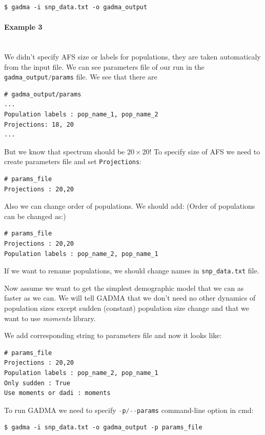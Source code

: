 \documentclass[12pt]{article}
\makeatletter
\newcommand{\moments}{\textit{moments}\xspace}
\newcommand{\py}[1]{\lstinline[language=Python, showstringspaces=False]@#1@}
\makeatother
\begin{document}
\begin{lstlisting}
$ gadma -i snp_data.txt -o gadma_output
\end{lstlisting}


\paragraph{Example 3}\mbox{}\\
We didn't specify AFS size or labels for populations, they are taken automaticaly from the input file. We can see parameters file of our run in the \py{gadma_output/params} file. We see that there are 
\begin{lstlisting}
# gadma_output/params
...
Population labels : pop_name_1, pop_name_2
Projections: 18, 20
...
\end{lstlisting}
But we know that spectrum should be $20 \times 20$! To specify size of AFS we need to create parameters file and set \py{Projections}:

\begin{lstlisting}
# params_file
Projections : 20,20
\end{lstlisting}

Also we can change order of populations. We should add: (Order of populations can be changed as:)
\begin{lstlisting}
# params_file
Projections : 20,20
Population labels : pop_name_2, pop_name_1
\end{lstlisting}

If we want to rename populations, we should change names in \py{snp_data.txt} file.

Now assume we want to get the simplest demographic model that we can as faster as we can. We will tell GADMA that we don't need no other dynamics of population sizes except sudden (constant) population size change and that we want to use \moments library.

We add corresponding string to parameters file and now it looks like:
\begin{lstlisting}
# params_file
Projections : 20,20
Population labels : pop_name_2, pop_name_1
Only sudden : True
Use moments or dadi : moments
\end{lstlisting}

To run GADMA we need to specify \py{-p/--params} command-line option in cmd:
\begin{lstlisting}
$ gadma -i snp_data.txt -o gadma_output -p params_file
\end{lstlisting}
\end{document}
